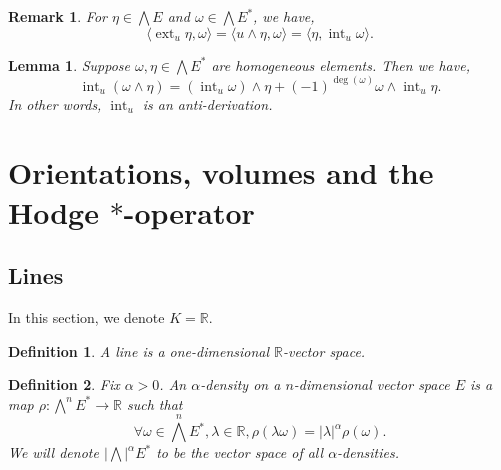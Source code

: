 \documentclass[8pt]{article}
\newtheorem{definition}{Definition}[section]
\newtheorem{lemma}{Lemma}[section]
\newtheorem{remark}{Remark}[section]
\DeclareMathOperator{\ext}{ext}
\DeclareMathOperator{\inte}{int}
\newcommand{\R}[0]{\mathbb{R}}
\begin{document}
\begin{remark}
  For $\eta\in\bigwedge E$ and $\omega\in\bigwedge E^*$, we have,
  \begin{equation*}
    \langle \ext_u\eta,\omega\rangle = \langle u\wedge\eta,\omega\rangle = \langle \eta,\inte_u\omega\rangle.
  \end{equation*}
\end{remark}

\begin{lemma}
  \label{lemma_10_12}
  Suppose $\omega,\eta\in\bigwedge E^*$ are homogeneous elements. Then we have,
  \begin{equation*}
    \inte_u(\omega\wedge\eta) = (\inte_u\omega)\wedge\eta + (-1)^{\deg(\omega)}\omega\wedge\inte_u\eta.
  \end{equation*}
  In other words, $\inte_u$ is an anti-derivation.
\end{lemma}


\section{Orientations, volumes and the Hodge $\ast$-operator}

\subsection{Lines}
In this section, we denote $K=\R$. 
\begin{definition}
  A line is a one-dimensional $\R$-vector space.
\end{definition}

\begin{definition}
  \label{definition_11_1}
  Fix $\alpha>0$. An $\alpha$-density on a $n$-dimensional vector space $E$ is a map $\rho:\bigwedge^nE^*\to\R$ such that 
  \begin{equation*}
    \forall \omega\in\bigwedge^nE^*,\lambda\in\R, \rho(\lambda\omega) = \vert\lambda\vert^\alpha\rho(\omega).
  \end{equation*}
  We will denote $\vert\bigwedge\vert^\alpha E^*$ to be the vector space of all $\alpha$-densities.
\end{definition}
\end{document}
